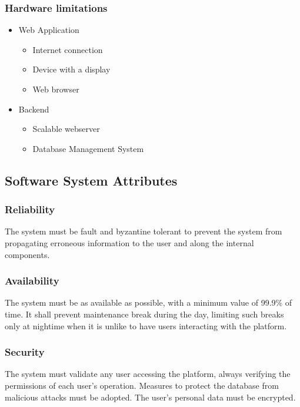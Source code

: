 \subsubsection{Hardware limitations}
\begin{itemize}
    \item Web Application
        \begin{itemize}
            \item Internet connection
            \item Device with a display
            \item Web browser  
        \end{itemize}
    \item Backend
        \begin{itemize}
            \item Scalable webserver
            \item Database Management System
        \end{itemize}
\end{itemize}

\subsection{Software System Attributes}

\subsubsection{Reliability}
The system must be fault and byzantine tolerant to prevent the system from propagating erroneous information to the user and along the internal components. 

\subsubsection{Availability}
The system must be as available as possible, with a minimum value of 99.9\% of time.
It shall prevent maintenance break during the day, limiting such breaks only at nightime when it is unlike to have users interacting with the platform.

\subsubsection{Security}
The system must validate any user accessing the platform, always verifying the permissions of each user's operation.
Measures to protect the database from malicious attacks must be adopted.
The user's personal data must be encrypted.


